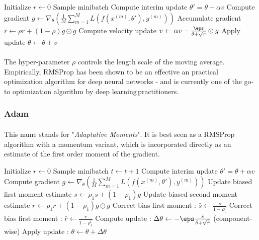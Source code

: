 \documentclass[a4paper]{article}
\newcommand\dl{deep learning\,}
\begin{document}
{{{				
				{
					Initialize $r\leftarrow 0$\;
					{
						Sample minibatch\;
						Compute interim update $\theta' = \theta + \alpha v$\;
						Compute gradient $g\leftarrow \nabla_\theta\left( \frac{1}{M}\sum_{m=1}^M L(f(x^{(m)},\theta'),y^{(m)})\right)$\;
						Accumulate gradient $r\leftarrow \rho r + (1-\rho)g\odot g$\;
						Compute velocity update $v\leftarrow \alpha v - \frac{\eps}{\delta + \sqrt{r}}\odot g$\;
						Apply update $\theta \leftarrow \theta + v$\;
					}
				}
				
				\paragraph{} The hyper-parameter $\rho$ controls the length scale of the moving average. Empirically, RMSProp has been shown to be an effective an practical optimization algorithm for deep neural networks - and is currently one of the go-to optimization algorithm by \dl practitioners.  
			}
			
			\subsubsection{Adam}
			{
				\paragraph{} This name stands for "\emph{Adaptative Moments}". It is best seen as a RMSProp algorithm with a momentum variant, which is incorporated directly as an estimate of the first order moment of the gradient. 
				\vspace{5pt}
				
				{
					Initialize $r\leftarrow 0$\;
					{
						Sample minibatch\;
						$t\leftarrow t +1$\;
						Compute interim update $\theta' = \theta + \alpha v$\;
						Compute gradient $g\leftarrow \nabla_\theta\left( \frac{1}{M}\sum_{m=1}^M L(f(x^{(m)},\theta'),y^{(m)})\right)$\;
						Update biased first moment estimate $s \leftarrow \rho_1 s + (1-\rho_1)g$\;
						Update biased second moment estimate $r \leftarrow \rho_1 r + (1-\rho_1)g\odot g$\;
						Correct bias first moment : $\hat{s} \leftarrow \frac{s}{1-\rho_1^t}$\;
						Correct bias first moment : $\hat{r} \leftarrow \frac{r}{1-\rho_1^t}$\;
						Compute update : $\Delta\theta \leftarrow -\eps\frac{\hat{s}}{\delta + \sqrt{\hat{r}}}$ (component-wise)\;
						Apply update : $\theta \leftarrow \theta + \Delta \theta$
					}
				}
			}
		}
}
\end{document}

